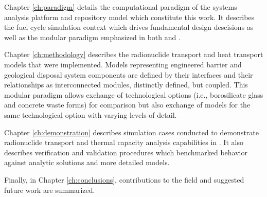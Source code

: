 Chapter \ref{ch:paradigm} details the computational paradigm of the \Cyclus 
systems analysis platform and \Cyder repository model which constitute this work. 
It describes the \Cyclus fuel cycle simulation context which drives fundamental 
\Cyder design descisions as well as the modular paradigm emphasized in both 
\Cyclus and \Cyder. 


Chapter \ref{ch:methodology} describes the radionuclide transport and heat 
transport models that were implemented. Models representing engineered barrier 
and geological disposal system components are defined by their interfaces and 
their relationships as interconnected modules, distinctly defined, but coupled. 
This modular paradigm allows exchange  of technological options (i.e., 
borosilicate glass and concrete waste forms) for comparison but also exchange of 
models for the same technological option with varying levels of detail.  


Chapter \ref{ch:demonstration} describes simulation cases conducted to 
demonstrate radionuclide transport and thermal capacity analysis capabilities in \Cyder. It 
also describes verification and validation procedures which benchmarked \Cyder 
behavior against analytic solutions and more detailed models.


Finally, in Chapter \ref{ch:conclusions}, contributions to the field and 
suggested future work are summarized. 




